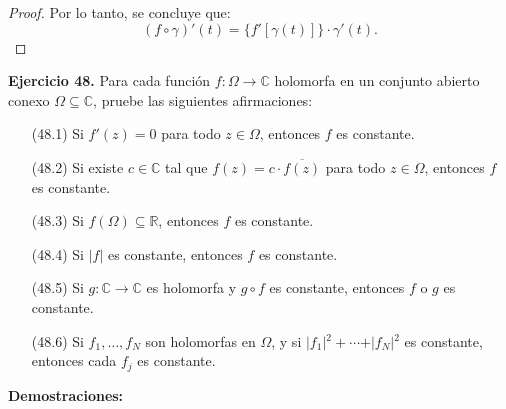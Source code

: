 \documentclass[11pt,a4paper]{article}
\theoremstyle{definition}
\theoremstyle{plain}
\theoremstyle{remark}
\begin{document}
\begin{proof}
		Por lo tanto, se concluye que:
		\[
		(f \circ \gamma)'(t) = \{f'[\gamma(t)]\} \cdot \gamma'(t).
		\]
	\end{proof}
	
	\noindent \textbf{Ejercicio 48.} Para cada función $f : \Omega \to \mathbb{C}$ holomorfa en un conjunto abierto conexo $\Omega \subseteq \mathbb{C}$, pruebe las siguientes afirmaciones:
	
	\begin{enumerate}
		\item[(48.1)] Si $f'(z) = 0$ para todo $z \in \Omega$, entonces $f$ es constante.
		\item[(48.2)] Si existe $c \in \mathbb{C}$ tal que $f(z) = c \cdot \overline{f(z)}$ para todo $z \in \Omega$, entonces $f$ es constante.
		\item[(48.3)] Si $f(\Omega) \subseteq \mathbb{R}$, entonces $f$ es constante.
		\item[(48.4)] Si $\vert{}f\vert{}$ es constante, entonces $f$ es constante.
		\item[(48.5)] Si $g : \mathbb{C} \to \mathbb{C}$ es holomorfa y $g \circ f$ es constante, entonces $f$ o $g$ es constante.
		\item[(48.6)] Si $f_1, \ldots, f_N$ son holomorfas en $\Omega$, y si $\vert{}f_1\vert{}^2 + \cdots + \vert{}f_N\vert{}^2$ es constante, entonces cada $f_j$ es constante.
	\end{enumerate}
	
	\vspace{1em}
	\noindent \textbf{Demostraciones:}
	
\end{document}
